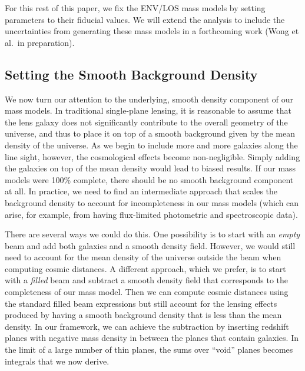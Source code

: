 \documentclass{emulateapj}
\begin{document}
For this rest of this paper, we fix the ENV/LOS mass models by setting parameters to their fiducial values. We will extend the analysis to include the uncertainties from generating these mass models in a forthcoming work (Wong et al.\ in preparation). 

\subsection{Setting the Smooth Background Density}
\label{sec:voids}

We now turn our attention to the underlying, smooth density component of our mass models. In traditional single-plane lensing, it is reasonable to assume that the lens galaxy does not significantly contribute to the overall geometry of the universe, and thus to place it on top of a smooth background given by the mean density of the universe.  As we begin to include more and more galaxies along the line sight, however, the cosmological effects become non-negligible.  Simply adding the galaxies on top of the mean density would lead to biased results.  If our mass models were 100\% complete, there should be no smooth background component at all.  In practice, we need to find an intermediate approach that scales the background density to account for incompleteness in our mass models (which can arise, for example, from having flux-limited photometric and spectroscopic data).

There are several ways we could do this.  One possibility is to start with an \emph{empty} beam and add both galaxies and a smooth density field.  However, we would still need to account for the mean density of the universe outside the beam when computing cosmic distances.  A different approach, which we prefer, is to start with a \emph{filled} beam and subtract a smooth density field that corresponds to the completeness of our mass model.  Then we can compute cosmic distances using the standard filled beam expressions but still account for the lensing effects produced by having a smooth background density that is less than the mean density.  In our framework, we can achieve the subtraction by inserting redshift planes with negative mass density in between the planes that contain galaxies.  In the limit of a large number of thin planes, the sums over ``void'' planes becomes integrals that we now derive.
\end{document}
